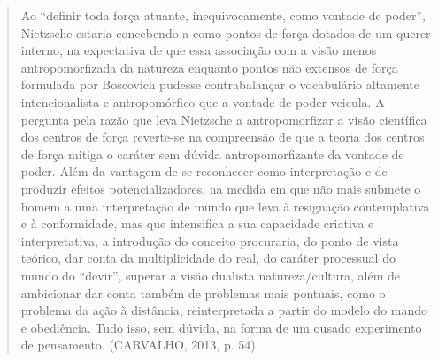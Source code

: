 \documentclass[
	12pt,				%
	openright,			%
	oneside,			%
	a4paper,			%
	english,			%
	french,				%
	spanish,			%
	brazil				%
	]{abntex2}
\begin{document}
\begin{quotation}
Ao “definir toda força atuante, inequivocamente, como vontade de poder”, Nietzsche estaria concebendo-a como pontos de força dotados de um querer interno, na expectativa de que essa associação com a visão menos antropomorfizada da natureza enquanto pontos não extensos de força formulada por Boscovich pudesse contrabalançar o vocabulário altamente intencionalista e antropomórfico que a vontade de poder veicula. A pergunta pela razão que leva Nietzsche a antropomorfizar a visão científica dos centros de força reverte-se na compreensão de que a teoria dos centros de força mitiga o caráter sem dúvida antropomorfizante da vontade de poder. Além da vantagem de se reconhecer como interpretação e de produzir efeitos potencializadores, na medida em que não mais submete o homem a uma interpretação de mundo que leva à resignação contemplativa e à conformidade, mas que intensifica a sua capacidade criativa e interpretativa, a introdução do conceito procuraria, do ponto de vista teórico, dar conta da multiplicidade do real, do caráter processual do mundo do “devir”, superar a visão dualista natureza/cultura, além de ambicionar dar conta também de problemas mais pontuais, como o problema da ação à distância, reinterpretada a partir do modelo do mando e obediência. Tudo isso, sem dúvida, na forma de um ousado experimento de pensamento. (CARVALHO, 2013, p. 54).
\end{quotation}
\end{document}
